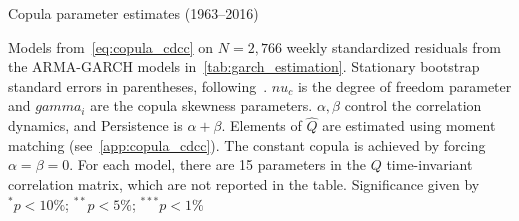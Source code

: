 
\begin{table}[p]
  \centering
  \footnotesize
  \renewcommand{\arraystretch}{1.2}

  \caption{Copula parameter estimates (1963--2016)}

  \begin{longcaption}
    Models from~\autoref{eq:copula_cdcc} on $N = 2,766$ weekly standardized residuals from the ARMA-GARCH models in~\autoref{tab:garch_estimation}. Stationary bootstrap standard errors in parentheses, following~\autocite{PolitisRomano1994}. $nu_c$ is the degree of freedom parameter and $gamma_i$ are the copula skewness parameters. $\alpha, \beta$ control the correlation dynamics, and Persistence is $\alpha + \beta$. Elements of $\hat{Q}$ are estimated using moment matching (see~\autoref{app:copula_cdcc}). The constant copula is achieved by forcing $\alpha = \beta = 0$. For each model, there are 15 parameters in the $Q$ time-invariant correlation matrix, which are not reported in the table. Significance given by $^{*}p<10\%$; $^{**}p<5\%$; $^{***}p<1\%$
  \end{longcaption}


\end{table}
